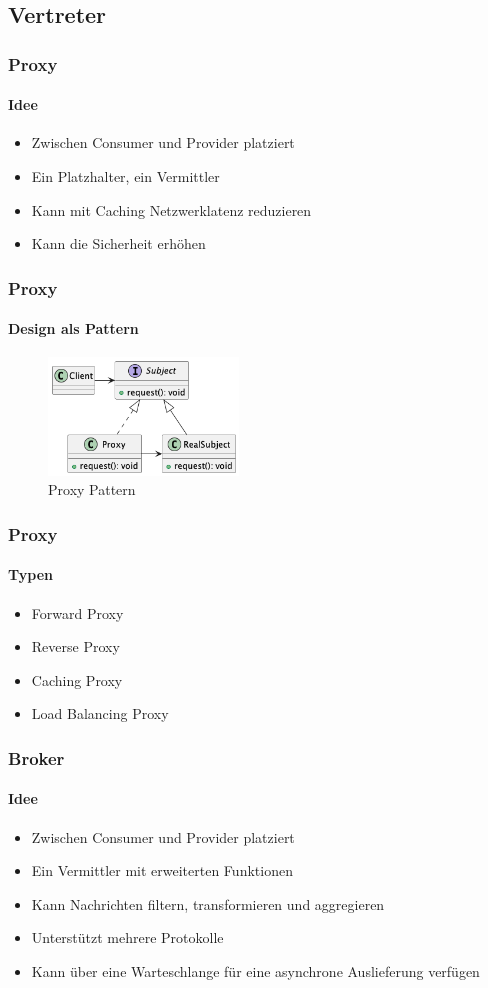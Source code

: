 \subsection{Vertreter}
\begin{frame}
  \frametitle{Proxy}
  \framesubtitle{Idee}
  \begin{itemize}
    \item Zwischen Consumer und Provider platziert
    \item Ein Platzhalter, ein Vermittler
    \item Kann mit Caching Netzwerklatenz reduzieren
    \item Kann die Sicherheit erhöhen
  \end{itemize}
\end{frame}

\begin{frame}
  \frametitle{Proxy}
  \framesubtitle{Design als Pattern}
\begin{figure}[ht]
  \centering
  \includegraphics[width=0.45\textwidth]{fig/uml/proxy.png}
  \caption{Proxy Pattern}
  \label{fig:proxy}
\end{figure}
\end{frame}

\begin{frame}
  \frametitle{Proxy}
  \framesubtitle{Typen}
  \begin{itemize}
    \item Forward Proxy
    \item Reverse Proxy
    \item Caching Proxy
    \item Load Balancing Proxy
  \end{itemize}
\end{frame}

\begin{frame}
  \frametitle{Broker}
  \framesubtitle{Idee}
  \begin{itemize}
    \item Zwischen Consumer und Provider platziert
    \item Ein Vermittler mit erweiterten Funktionen
    \item Kann Nachrichten filtern, transformieren und aggregieren
    \item Unterstützt mehrere Protokolle
    \item Kann über eine Warteschlange für eine asynchrone Auslieferung verfügen
  \end{itemize}
\end{frame}

